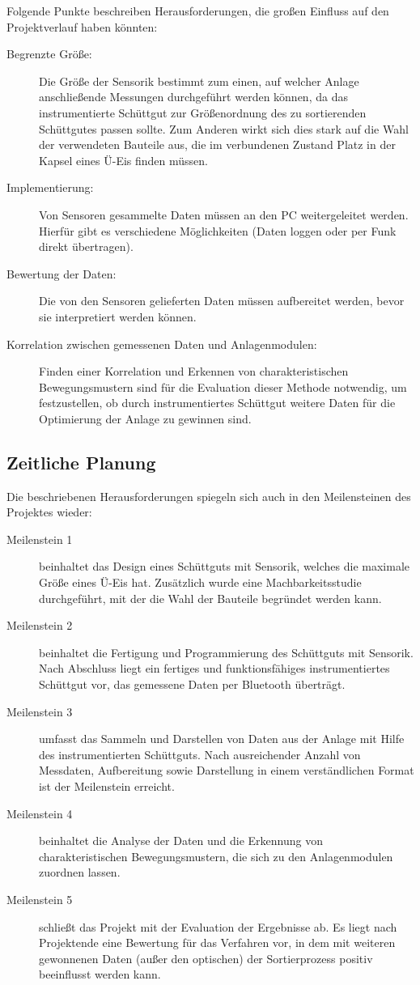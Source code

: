 Folgende Punkte beschreiben Herausforderungen, die großen Einfluss auf den Projektverlauf haben könnten:
\begin{description}
	\item [Begrenzte Größe:] Die Größe der Sensorik bestimmt zum einen, auf welcher Anlage anschließende Messungen durchgeführt werden können, da das instrumentierte Schüttgut zur Größenordnung des zu sortierenden Schüttgutes passen sollte. Zum Anderen wirkt sich dies stark auf die Wahl der verwendeten Bauteile aus, die im verbundenen Zustand Platz in der Kapsel eines Ü-Eis finden müssen.
	\item [Implementierung:] Von Sensoren gesammelte Daten müssen an den PC weitergeleitet werden. Hierfür gibt es verschiedene Möglichkeiten (Daten loggen oder per Funk direkt übertragen).
	\item [Bewertung der Daten:] Die von den Sensoren gelieferten Daten müssen aufbereitet werden, bevor sie interpretiert werden können.
	\item [Korrelation zwischen gemessenen Daten und Anlagenmodulen:] Finden einer Korrelation und Erkennen von charakteristischen Bewegungsmustern sind für die Evaluation dieser Methode notwendig, um festzustellen, ob durch instrumentiertes Schüttgut weitere Daten für die Optimierung der Anlage zu gewinnen sind. 
\end{description} 

\subsection{Zeitliche Planung}
Die beschriebenen Herausforderungen spiegeln sich auch in den Meilensteinen des Projektes wieder:
\begin{description}
	\item [Meilenstein 1] beinhaltet das Design eines Schüttguts mit Sensorik, welches die maximale Größe eines Ü-Eis hat. Zusätzlich wurde eine Machbarkeitsstudie durchgeführt, mit der die Wahl der Bauteile begründet werden kann.
	\item [Meilenstein 2] beinhaltet die Fertigung und Programmierung des Schüttguts mit Sensorik. Nach Abschluss liegt ein fertiges und funktionsfähiges instrumentiertes Schüttgut vor, das gemessene Daten per Bluetooth überträgt.
	\item [Meilenstein 3] umfasst das Sammeln und Darstellen von Daten aus der Anlage mit Hilfe des instrumentierten Schüttguts. Nach ausreichender Anzahl von Messdaten, Aufbereitung sowie Darstellung in einem verständlichen Format ist der Meilenstein erreicht.
	\item [Meilenstein 4] beinhaltet die Analyse der Daten und die Erkennung von charakteristischen Bewegungsmustern, die sich zu den Anlagenmodulen zuordnen lassen.
	\item [Meilenstein 5] schließt das Projekt mit der Evaluation der Ergebnisse ab. Es liegt nach Projektende eine Bewertung für das Verfahren vor, in dem mit  weiteren gewonnenen Daten (außer den optischen) der Sortierprozess positiv beeinflusst werden kann.
\end{description}
	

